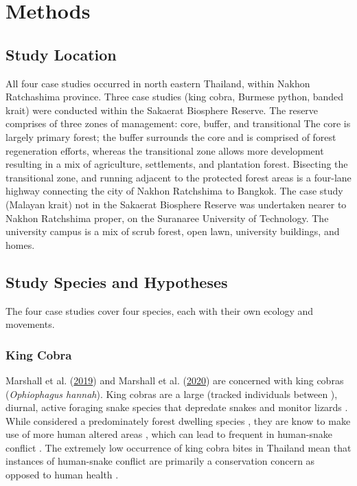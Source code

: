 \documentclass[10pt,a4paper]{article}
\begin{document}
\hypertarget{methods}{%
\section{Methods}\label{methods}}

\hypertarget{study-location}{%
\subsection{Study Location}\label{study-location}}

All four case studies occurred in north eastern Thailand, within Nakhon Ratchashima province.
Three case studies (king cobra, Burmese python, banded krait) were conducted within the Sakaerat Biosphere Reserve.
The reserve comprises of three zones of management: core, buffer, and transitional
The core is largely primary forest; the buffer surrounds the core and is comprised of forest regeneration efforts, whereas the transitional zone allows more development resulting in a mix of agriculture, settlements, and plantation forest.
Bisecting the transitional zone, and running adjacent to the protected forest areas is a four-lane highway connecting the city of Nakhon Ratchshima to Bangkok.
The case study (Malayan krait) not in the Sakaerat Biosphere Reserve was undertaken nearer to Nakhon Ratchshima proper, on the Suranaree University of Technology.
The university campus is a mix of scrub forest, open lawn, university buildings, and homes.

\hypertarget{study-species-and-hypotheses}{%
\subsection{Study Species and Hypotheses}\label{study-species-and-hypotheses}}

The four case studies cover four species, each with their own ecology and movements.

\hypertarget{king-cobra}{%
\subsubsection{King Cobra}\label{king-cobra}}

Marshall et al. (\protect\hyperlink{ref-Marshall2018}{2019}) and Marshall et al. (\protect\hyperlink{ref-marshall_no_2020}{2020}) are concerned with king cobras (\emph{Ophiophagus hannah}).
King cobras are a large (tracked individuals between ), diurnal, active foraging snake species that depredate snakes and monitor lizards .
While considered a predominately forest dwelling species , they are know to make use of more human altered areas , which can lead to frequent in human-snake conflict .
The extremely low occurrence of king cobra bites in Thailand mean that instances of human-snake conflict are primarily a conservation concern as opposed to human health .
\end{document}
